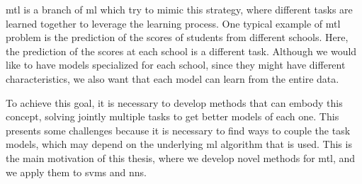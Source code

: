 \acrfull{mtl} is a branch of \acrshort{ml} which try to mimic this strategy, where different tasks are learned together to leverage the learning process. 
One typical example of \acrshort{mtl} problem is the prediction of the scores of students from different schools. Here, the prediction of the scores at each school is a different task. 
%
Although we would like to have models specialized for each school, since they might have different characteristics, we also want that each model can learn from the entire data. 
%

To achieve this goal, it is necessary to develop methods that can embody this concept, solving jointly multiple tasks to get better models of each one. This presents some challenges because it is necessary to find ways to couple the task models, which may depend on the underlying \acrshort{ml} algorithm that is used. 
This is the main motivation of this thesis, where we develop novel methods for \acrshort{mtl}, and we apply them to \acrshort{svms} and \acrshort{nns}.









